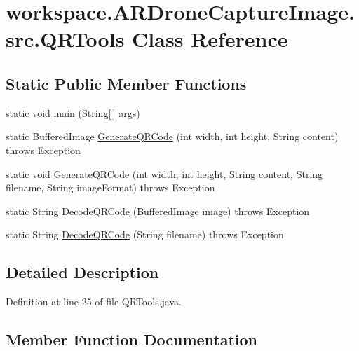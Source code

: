 \hypertarget{classworkspace_1_1_a_r_drone_capture_image_1_1src_1_1_q_r_tools}{}\section{workspace.\+A\+R\+Drone\+Capture\+Image.\+src.\+Q\+R\+Tools Class Reference}
\label{classworkspace_1_1_a_r_drone_capture_image_1_1src_1_1_q_r_tools}
\subsection*{Static Public Member Functions}
\begin{DoxyCompactItemize}
\item 
static void \hyperlink{classworkspace_1_1_a_r_drone_capture_image_1_1src_1_1_q_r_tools_a5da88f900e9713adc3e24bac2b46b679}{main} (String\mbox{[}$\,$\mbox{]} args)
\item 
static Buffered\+Image \hyperlink{classworkspace_1_1_a_r_drone_capture_image_1_1src_1_1_q_r_tools_a423b4e5f2340e6c677b83bf43722d726}{Generate\+Q\+R\+Code} (int width, int height, String content)  throws Exception 
\item 
static void \hyperlink{classworkspace_1_1_a_r_drone_capture_image_1_1src_1_1_q_r_tools_a7e9b022998d8d934d8f7bd0435faef1f}{Generate\+Q\+R\+Code} (int width, int height, String content, String filename, String image\+Format)  throws Exception 
\item 
static String \hyperlink{classworkspace_1_1_a_r_drone_capture_image_1_1src_1_1_q_r_tools_a0be4c483192776f45ff0fae15c54a870}{Decode\+Q\+R\+Code} (Buffered\+Image image)  throws Exception 
\item 
static String \hyperlink{classworkspace_1_1_a_r_drone_capture_image_1_1src_1_1_q_r_tools_a2a0657098c3e0105d1512ed949e22e6a}{Decode\+Q\+R\+Code} (String filename)  throws Exception 
\end{DoxyCompactItemize}


\subsection{Detailed Description}


Definition at line 25 of file Q\+R\+Tools.\+java.



\subsection{Member Function Documentation}
\hypertarget{classworkspace_1_1_a_r_drone_capture_image_1_1src_1_1_q_r_tools_a0be4c483192776f45ff0fae15c54a870}{}

